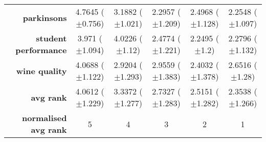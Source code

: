 \begin{table}[htb]
{\begin{tabular}{r|ccccc}
                  \textbf{parkinsons}          & \cellcolor[rgb]{ .973,  .412,  .42}4.7645 ($\pm$0.756)  & \cellcolor[rgb]{ .992,  .769,  .49}3.1882 ($\pm$1.021)  & \cellcolor[rgb]{ .49,  .773,  .486}2.2957 ($\pm$1.209)  & \cellcolor[rgb]{ 1,  .922,  .518}2.4968 ($\pm$1.128)    & \cellcolor[rgb]{ .388,  .745,  .482}2.2548 ($\pm$1.097) \\
                  \textbf{student performance} & \cellcolor[rgb]{ .976,  .431,  .424}3.971 ($\pm$1.094)  & \cellcolor[rgb]{ .973,  .412,  .42}4.0226 ($\pm$1.12)   & \cellcolor[rgb]{ 1,  .922,  .518}2.4774 ($\pm$1.221)    & \cellcolor[rgb]{ .388,  .745,  .482}2.2495 ($\pm$1.2)   & \cellcolor[rgb]{ .467,  .765,  .486}2.2796 ($\pm$1.132) \\
                  \textbf{wine quality}        & \cellcolor[rgb]{ .973,  .412,  .42}4.0688 ($\pm$1.122)  & \cellcolor[rgb]{ 1,  .922,  .518}2.9204 ($\pm$1.293)    & \cellcolor[rgb]{ 1,  .906,  .518}2.9559 ($\pm$1.383)    & \cellcolor[rgb]{ .388,  .745,  .482}2.4032 ($\pm$1.378) & \cellcolor[rgb]{ .678,  .827,  .498}2.6516 ($\pm$1.28)  \\
                  \midrule
                  \textbf{avg rank}            & \cellcolor[rgb]{ .973,  .412,  .42}4.0612 ($\pm$1.229)  & \cellcolor[rgb]{ .988,  .69,  .475}3.3372 ($\pm$1.277)  & \cellcolor[rgb]{ 1,  .922,  .518}2.7327 ($\pm$1.283)    & \cellcolor[rgb]{ .647,  .82,  .494}2.5151 ($\pm$1.282)  & \cellcolor[rgb]{ .388,  .745,  .482}2.3538 ($\pm$1.266) \\
                  \midrule
                  \textbf{normalised avg rank} & \cellcolor[rgb]{ .973,  .412,  .42}5                    & \cellcolor[rgb]{ .988,  .667,  .471}4                   & \cellcolor[rgb]{ 1,  .922,  .518}3                      & \cellcolor[rgb]{ .694,  .831,  .498}2                   & \cellcolor[rgb]{ .388,  .745,  .482}1                   \\
            \end{tabular}%

      }
\end{table}%

